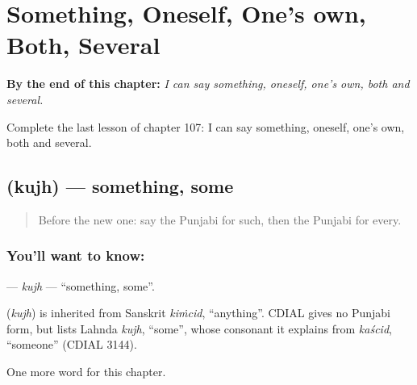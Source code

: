 
\chapter{Something, Oneself, One's own, Both, Several}
\label{ch:pa-something-oneself-one-s-own-both-several}

\begin{chapteropening}
\textbf{By the end of this chapter:} \emph{I can say something, oneself, one's own, both and several.}

Complete the last lesson of chapter 107: I can say something, oneself, one's own, both and several.
\end{chapteropening}

\section[\texorpdfstring{\pa{ਕੁਝ} (kujh)}{ਕੁਝ (kujh)}]{ (kujh) — something, some}

\label{lesson:PA-C107-kujh}



\begin{quote}
Before the new one: say the Punjabi for such, then the Punjabi for every.
\end{quote}

\subsection*{You'll want to know: }
\textbf{} — \emph{kujh} — \textquotedblleft{}something, some\textquotedblright{}.

\begin{cousinweb}
\textbf{} (\emph{kujh}) is inherited from Sanskrit \emph{kiṁcid}, \textquotedblleft{}anything\textquotedblright{}. CDIAL gives no Punjabi form, but lists Lahnda \emph{kujh}, \textquotedblleft{}some\textquotedblright{}, whose consonant it explains from \emph{kaścid}, \textquotedblleft{}someone\textquotedblright{} (CDIAL 3144).
\end{cousinweb}

\begin{grammarlens}[title={What you've built}]
One more word for this chapter.
\end{grammarlens}

